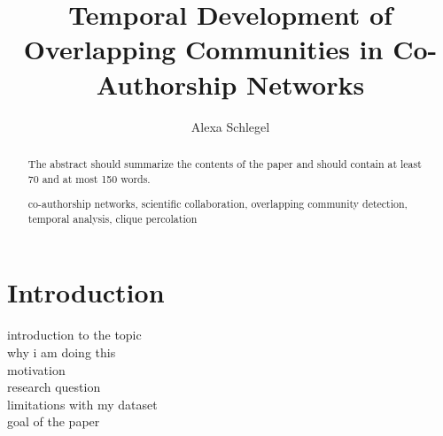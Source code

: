 \documentclass[runningheads,a4paper]{llncs}
\newcommand{\keywords}[1]{\par\addvspace\baselineskip
\noindent\keywordname\enspace\ignorespaces#1}
\begin{document}
\mainmatter  %

\title{Temporal Development of Overlapping Communities in Co-Authorship Networks}


%
%
\author{Alexa Schlegel%
}
%


%
%

\maketitle


\begin{abstract}
The abstract should summarize the contents of the paper and should
contain at least 70 and at most 150 words.
\keywords{co-authorship networks, scientific collaboration, overlapping community detection, temporal analysis, clique percolation}
\end{abstract}

\section{Introduction}
introduction to the topic\\
why i am doing this\\
motivation\\
research question\\
limitations with my dataset\\
goal of the paper\\
\end{document}
